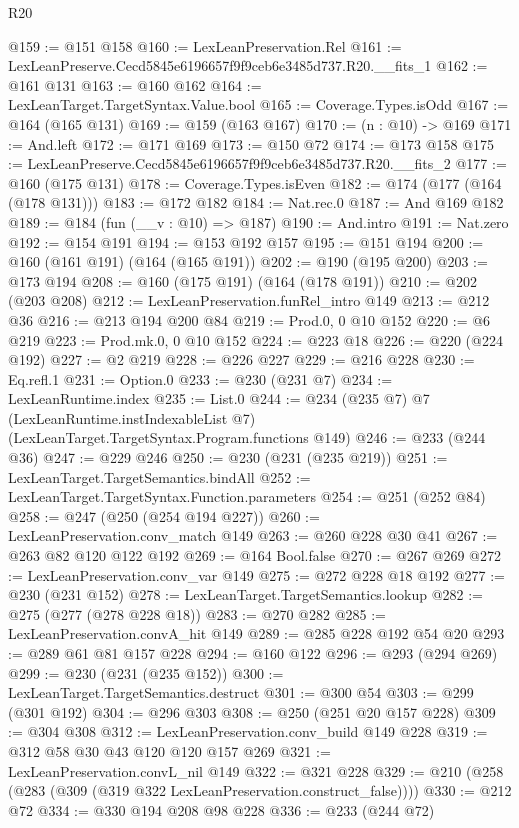 \begin{lexlean}{R20}
\begin{coremodule}
@159 := @151 @158
@160 := LexLeanPreservation.Rel
@161 := LexLeanPreserve.Cecd5845e6196657f9f9ceb6e3485d737.R20.__fits_1
@162 := @161 @131
@163 := @160 @162
@164 := LexLeanTarget.TargetSyntax.Value.bool
@165 := Coverage.Types.isOdd
@167 := @164 (@165 @131)
@169 := @159 (@163 @167)
@170 := (n : @10) -> @169
@171 := And.left
@172 := @171 @169
@173 := @150 @72
@174 := @173 @158
@175 := LexLeanPreserve.Cecd5845e6196657f9f9ceb6e3485d737.R20.__fits_2
@177 := @160 (@175 @131)
@178 := Coverage.Types.isEven
@182 := @174 (@177 (@164 (@178 @131)))
@183 := @172 @182
@184 := Nat.rec.{0}
@187 := And @169 @182
@189 := @184 (fun (__v : @10) => @187)
@190 := And.intro
@191 := Nat.zero
@192 := @154 @191
@194 := @153 @192 @157
@195 := @151 @194
@200 := @160 (@161 @191) (@164 (@165 @191))
@202 := @190 (@195 @200)
@203 := @173 @194
@208 := @160 (@175 @191) (@164 (@178 @191))
@210 := @202 (@203 @208)
@212 := LexLeanPreservation.funRel_intro @149
@213 := @212 @36
@216 := @213 @194 @200 @84
@219 := Prod.{0, 0} @10 @152
@220 := @6 @219
@223 := Prod.mk.{0, 0} @10 @152
@224 := @223 @18
@226 := @220 (@224 @192)
@227 := @2 @219
@228 := @226 @227
@229 := @216 @228
@230 := Eq.refl.{1}
@231 := Option.{0}
@233 := @230 (@231 @7)
@234 := LexLeanRuntime.index
@235 := List.{0}
@244 := @234
    (@235 @7)
    @7
    (LexLeanRuntime.instIndexableList @7)
    (LexLeanTarget.TargetSyntax.Program.functions @149)
@246 := @233 (@244 @36)
@247 := @229 @246
@250 := @230 (@231 (@235 @219))
@251 := LexLeanTarget.TargetSemantics.bindAll
@252 := LexLeanTarget.TargetSyntax.Function.parameters
@254 := @251 (@252 @84)
@258 := @247 (@250 (@254 @194 @227))
@260 := LexLeanPreservation.conv_match @149
@263 := @260 @228 @30 @41
@267 := @263 @82 @120 @122 @192
@269 := @164 Bool.false
@270 := @267 @269
@272 := LexLeanPreservation.conv_var @149
@275 := @272 @228 @18 @192
@277 := @230 (@231 @152)
@278 := LexLeanTarget.TargetSemantics.lookup
@282 := @275 (@277 (@278 @228 @18))
@283 := @270 @282
@285 := LexLeanPreservation.convA_hit @149
@289 := @285 @228 @192 @54 @20
@293 := @289 @61 @81 @157 @228
@294 := @160 @122
@296 := @293 (@294 @269)
@299 := @230 (@231 (@235 @152))
@300 := LexLeanTarget.TargetSemantics.destruct
@301 := @300 @54
@303 := @299 (@301 @192)
@304 := @296 @303
@308 := @250 (@251 @20 @157 @228)
@309 := @304 @308
@312 := LexLeanPreservation.conv_build @149 @228
@319 := @312 @58 @30 @43 @120 @120 @157 @269
@321 := LexLeanPreservation.convL_nil @149
@322 := @321 @228
@329 := @210 (@258 (@283 (@309 (@319 @322 LexLeanPreservation.construct_false))))
@330 := @212 @72
@334 := @330 @194 @208 @98 @228
@336 := @233 (@244 @72)

\end{coremodule}
\end{lexlean}
